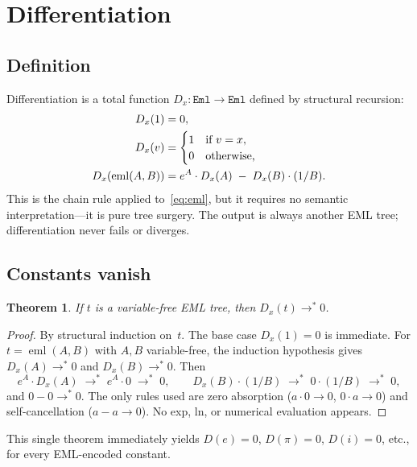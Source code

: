 \documentclass[11pt]{article}
\newtheorem{theorem}{Theorem}
\begin{document}
\section{Differentiation}
\label{sec:diff}

\subsection{Definition}

Differentiation is a total function $D_x : \texttt{Eml} \to \texttt{Eml}$
defined by structural recursion:
\begin{align}
  D_x(1) &= 0, \notag\\
  D_x(v) &= \begin{cases} 1 & \text{if } v = x, \\ 0 & \text{otherwise,} \end{cases} \notag\\
  D_x(\operatorname{eml}(A,B)) &=
    e^A \cdot D_x(A) \;-\; D_x(B) \cdot (1/B).
  \label{eq:diff}
\end{align}
This is the chain rule applied to~\eqref{eq:eml}, but it requires no
semantic interpretation---it is pure tree surgery.  The output is always
another EML tree; differentiation never fails or diverges.

\subsection{Constants vanish}

\begin{theorem}\label{thm:const-zero}
If $t$ is a variable-free EML tree, then $D_x(t) \to^{*} 0$.
\end{theorem}

\begin{proof}
By structural induction on~$t$.  The base case $D_x(1) = 0$ is
immediate.  For $t = \operatorname{eml}(A,B)$ with $A,B$ variable-free,
the induction hypothesis gives $D_x(A) \to^{*} 0$ and
$D_x(B) \to^{*} 0$.  Then
\[
  e^A \cdot D_x(A) \;\to^{*}\; e^A \cdot 0 \;\to^{*}\; 0,
  \qquad
  D_x(B) \cdot (1/B) \;\to^{*}\; 0 \cdot (1/B) \;\to^{*}\; 0,
\]
and $0 - 0 \to^{*} 0$.  The only rules used are zero absorption
($a \cdot 0 \to 0$, $0 \cdot a \to 0$) and self-cancellation
($a - a \to 0$).  No exp, ln, or numerical evaluation appears.
\end{proof}

This single theorem immediately yields $D(e) = 0$, $D(\pi) = 0$,
$D(i) = 0$, etc., for every EML-encoded constant.
\end{document}
